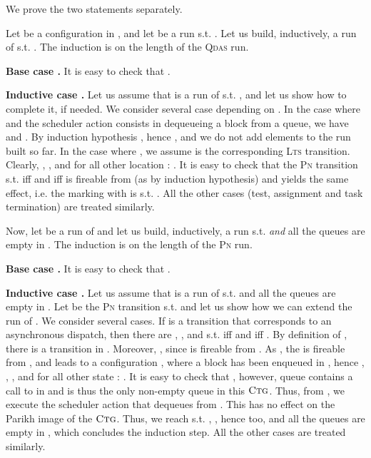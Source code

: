 \documentclass[runningheads,oribibl,]{article}
\newcommand{\lts}{\textsc{Lts}\xspace}
\newcommand{\pn}{\textsc{Pn}\xspace}
\newcommand{\qdas}{\textsc{Qdas}\xspace}
\newcommand{\ctg}{\ensuremath{\textsc{Ctg}}\xspace}
\newenvironment{proof}{\noindent{\it Proof.\hspace*{.5cm}}}{}
\newcommand{\qed}{\hfill}
\begin{document}
\begin{proof}
  We prove the two statements separately.

  Let  be a configuration in , and let
   be a
  run s.t. . Let us build, inductively, a run
   of  s.t. . The
  induction is on the length  of the \qdas run.

  \textbf{Base case .} It is easy to check that .

  \textbf{Inductive case .} Let us assume that  is a run of  s.t. ,
  and let us show how to complete it, if needed. We consider several
  case depending on . In the case where 
  and the scheduler action consists in dequeueing a block from a queue,
  we have  and
  . By induction hypothesis , hence ,
  and we do not add elements to the run built so far. In the case
  where , we assume
   is the corresponding \lts
  transition. Clearly,
  ,
  ,
   and
  for all other location :
  . It is easy to check
  that the \pn transition  s.t.  iff  and
   iff  is fireable from  (as
   by induction hypothesis) and
  yields the same effect, i.e. the marking  with
   is s.t. . All the
  other cases (test, assignment and task termination) are treated
  similarly.  \medskip

  Now, let  be a run of  and let us build,
  inductively, a run  s.t.  \emph{and} all
  the queues are empty in . The induction is on the length  of
  the \pn run.

  \textbf{Base case .} It is easy to check that .

  \textbf{Inductive case .} Let us assume that
   is a run of 
  s.t.  and all the queues are empty in
  . Let  be the \pn transition
  s.t.  and let us show how we can
  extend the run of . We consider several cases. If  is a
  transition that corresponds to an asynchronous dispatch, then there
  are , ,  and  s.t.  iff  and
   iff . By definition of ,
  there is a transition  in . Moreover,
  , since  is fireable from . As
  , the  is
  fireable from , and leads to a configuration
  , where a  block has been enqueued
  in , hence ,
  ,
  ,
   and for
  all other state : . It
  is easy to check that , however,
  queue  contains a call to  in  and is thus the
  only non-empty queue in this \ctg. Thus, from
  , we execute the scheduler action that
  dequeues from . This has no effect on the Parikh image of the
  \ctg. Thus, we reach 
  s.t. , ,
  hence  too, and all the queues are
  empty in , which concludes the induction step. All the
  other cases are treated similarly.\qed
\end{proof}
\end{document}
